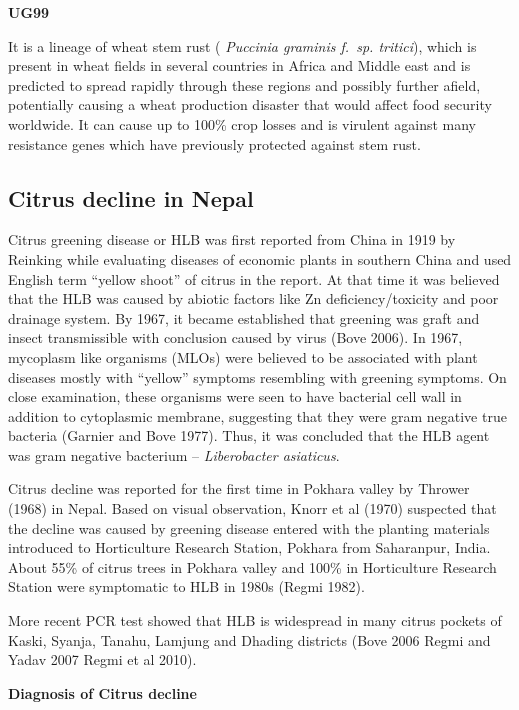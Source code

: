 \documentclass[
  openany]{book}
\begin{document}
\textbf{UG99}

It is a lineage of wheat stem rust ( \emph{Puccinia graminis f.~sp. tritici}), which is present in wheat fields in several countries in Africa and Middle east and is predicted to spread rapidly through these regions and possibly further afield, potentially causing a wheat production disaster that would affect food security worldwide. It can cause up to 100\% crop losses and is virulent against many resistance genes which have previously protected against stem rust.

\hypertarget{citrus-decline-in-nepal}{%
\subsection{Citrus decline in Nepal}\label{citrus-decline-in-nepal}}

Citrus greening disease or HLB was first reported from China in 1919 by Reinking while evaluating diseases of economic plants in southern China and used English term ``yellow shoot'' of citrus in the report. At that time it was believed that the HLB was caused by abiotic factors like Zn deficiency/toxicity and poor drainage system. By 1967, it became established that greening was graft and insect transmissible with conclusion caused by virus (Bove 2006). In 1967, mycoplasm like organisms (MLOs) were believed to be associated with plant diseases mostly with ``yellow'' symptoms resembling with greening symptoms. On close examination, these organisms were seen to have bacterial cell wall in addition to cytoplasmic membrane, suggesting that they were gram negative true bacteria (Garnier and Bove 1977). Thus, it was concluded that the HLB agent was gram negative bacterium -- \emph{Liberobacter asiaticus}.

Citrus decline was reported for the first time in Pokhara valley by Thrower (1968) in Nepal. Based on visual observation, Knorr et al (1970) suspected that the decline was caused by greening disease entered with the planting materials introduced to Horticulture Research Station, Pokhara from Saharanpur, India. About 55\% of citrus trees in Pokhara valley and 100\% in Horticulture Research Station were symptomatic to HLB in 1980s (Regmi 1982).

More recent PCR test showed that HLB is widespread in many citrus pockets of Kaski, Syanja, Tanahu, Lamjung and Dhading districts (Bove 2006 Regmi and Yadav 2007 Regmi et al 2010).

\textbf{Diagnosis of Citrus decline}
\end{document}
